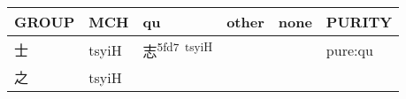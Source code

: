 \documentclass[14pt,a4paper]{scrartcl}
\begin{document}
\begin{longtable}[c]{@{}llllll@{}}
\toprule
\begin{minipage}[b]{0.14\columnwidth}\raggedright\strut
GROUP
\strut\end{minipage} &
\begin{minipage}[b]{0.14\columnwidth}\raggedright\strut
MCH
\strut\end{minipage} &
\begin{minipage}[b]{0.14\columnwidth}\raggedright\strut
qu
\strut\end{minipage} &
\begin{minipage}[b]{0.14\columnwidth}\raggedright\strut
other
\strut\end{minipage} &
\begin{minipage}[b]{0.14\columnwidth}\raggedright\strut
none
\strut\end{minipage} &
\begin{minipage}[b]{0.14\columnwidth}\raggedright\strut
PURITY
\strut\end{minipage}\tabularnewline
\midrule
\endhead
\begin{minipage}[t]{0.14\columnwidth}\raggedright\strut
士
\strut\end{minipage} &
\begin{minipage}[t]{0.14\columnwidth}\raggedright\strut
tsyiH
\strut\end{minipage} &
\begin{minipage}[t]{0.14\columnwidth}\raggedright\strut
志\textsuperscript{5fd7~tsyiH}
\strut\end{minipage} &
\begin{minipage}[t]{0.14\columnwidth}\raggedright\strut
\strut\end{minipage} &
\begin{minipage}[t]{0.14\columnwidth}\raggedright\strut
\strut\end{minipage} &
\begin{minipage}[t]{0.14\columnwidth}\raggedright\strut
pure:qu
\strut\end{minipage}\tabularnewline
\begin{minipage}[t]{0.14\columnwidth}\raggedright\strut
之
\strut\end{minipage} &
\begin{minipage}[t]{0.14\columnwidth}\raggedright\strut
tsyiH
\strut\end{minipage} &
\begin{minipage}[t]{0.14\columnwidth}\raggedright\strut
\strut\end{minipage} &

\end{longtable}
\end{document}
